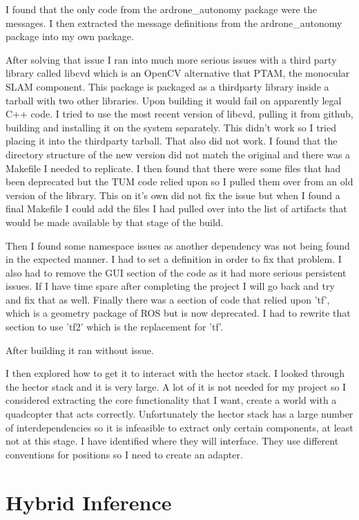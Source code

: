 \documentclass[]{../resources/final_report}
\begin{document}
I found that the only code from the ardrone\_autonomy package were the messages. I then extracted 
the message definitions from the ardrone\_autonomy package into my own package.

After solving that issue I ran into much more serious issues with a third party library called 
libcvd which is an OpenCV alternative that PTAM, the monocular SLAM component.
This package is packaged as a thirdparty library inside a tarball with two other libraries.
Upon building it would fail on apparently legal C++ code. I tried to use the most recent version of 
libcvd, pulling it from github, building and installing it on the system separately. This didn't work 
so I tried placing it into the thirdparty tarball. That also did not work. I found that the directory
structure of the new version did not match the original and there was a Makefile I needed to 
replicate. I then found that there were some files that had been deprecated but the TUM code relied 
upon so I pulled them over from an old version of the library. This on it's own did not fix the 
issue but when I found a final Makefile I could add the files I had pulled over into the list of 
artifacts that would be made available by that stage of the build. 

Then I found some namespace issues as another dependency was not being found in the expected manner.
I had to set a definition in order to fix that problem. I also had to remove the GUI section of the 
code as it had more serious persistent issues. If I have time spare after completing the project I 
will go back and try and fix that as well. Finally there was a section of code that relied upon 'tf', 
which is a geometry package of ROS but is now deprecated. I had to rewrite that section to use 'tf2' 
which is the replacement for 'tf'.

After building it ran without issue.

I then explored how to get it to interact with the hector stack. I looked through the hector stack and it is 
very large. A lot of it is not needed for my project so I considered extracting the core functionality
that I want, create a world with a quadcopter that acts correctly. Unfortunately the hector stack 
has a large number of interdependencies so it is infeasible to extract only certain components, at 
least not at this stage. I have identified where they will interface. They use different conventions 
for positions so I need to create an adapter.

\section{Hybrid Inference}
\end{document}
